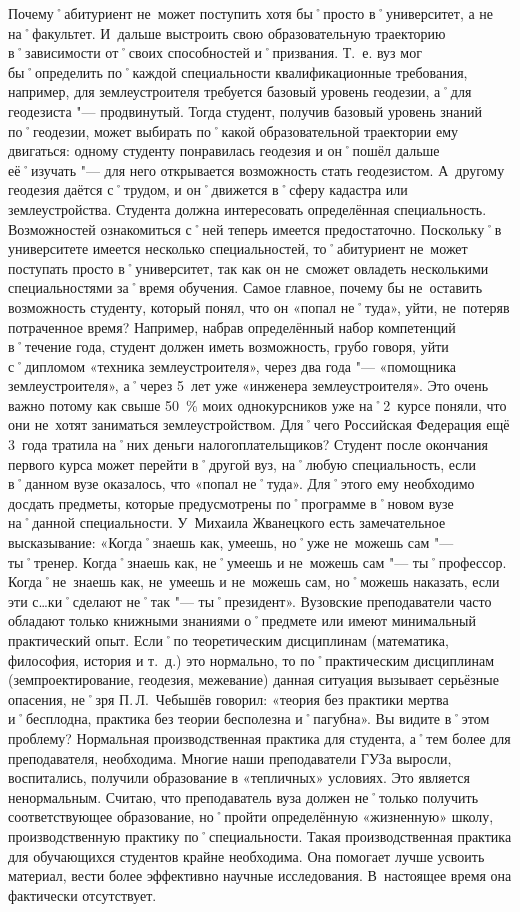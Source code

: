 \begin{drama}
	\maxspeaks Почему˚абитуриент не~может поступить хотя бы˚просто в˚университет, а не на˚факультет. И~дальше выстроить свою образовательную траекторию в˚зависимости от˚своих способностей и˚призвания. Т.~е. вуз мог бы˚определить по˚каждой специальности квалификационные требования, например, для землеустроителя требуется базовый уровень геодезии, а˚для геодезиста "--- продвинутый. Тогда студент, получив базовый уровень знаний по˚геодезии, может выбирать по˚какой образовательной траектории ему двигаться: одному студенту понравилась геодезия и он˚пошёл дальше её˚изучать "--- для него открывается возможность стать геодезистом. А~другому геодезия даётся с˚трудом, и он˚движется в˚сферу кадастра или землеустройства. 
	\michaelspeaks Студента должна интересовать определённая специальность. Возможностей ознакомиться с˚ней теперь имеется предостаточно. Поскольку˚в университете имеется несколько специальностей, то˚абитуриент не~может поступать просто в˚университет, так как он не~сможет овладеть несколькими специальностями за˚время обучения.
	\maxspeaks Самое главное, почему бы не~оставить возможность студенту, который понял, что он  «попал не˚туда», уйти, не~потеряв потраченное время? Например, набрав определённый набор компетенций в˚течение года, студент должен иметь возможность, грубо говоря, уйти с˚дипломом  «техника землеустроителя», через два года "---  «помощника землеустроителя», а˚через 5~лет уже  «инженера землеустроителя». Это очень важно потому как свыше 50~\% моих однокурсников уже на˚2~курсе поняли, что они не~хотят заниматься землеустройством. Для˚чего Российская Федерация ещё 3~года тратила на˚них деньги налогоплательщиков?
	\michaelspeaks Студент после окончания первого курса может перейти в˚другой вуз, на˚любую специальность, если в˚данном вузе оказалось, что «попал не˚туда». Для˚этого ему необходимо досдать предметы, которые предусмотрены по˚программе в˚новом вузе на˚данной специальности.
	\maxspeaks У~Михаила Жванецкого есть замечательное высказывание:  «Когда˚знаешь как, умеешь, но˚уже не~можешь сам "--- ты˚тренер. Когда˚знаешь как, не˚умеешь и не~можешь сам "--- ты˚профессор. Когда˚не~знаешь как, не~умеешь и не~можешь сам, но˚можешь наказать, если эти с…ки˚сделают не˚так "--- ты˚президент». Вузовские преподаватели часто обладают только книжными знаниями о˚предмете или имеют минимальный практический опыт. Если˚по теоретическим дисциплинам (математика, философия, история и т.~д.) это нормально, то по˚практическим дисциплинам (земпроектирование, геодезия, межевание) данная ситуация вызывает серьёзные опасения, не˚зря П.\,Л.~Чебышёв говорил:  «теория без практики мертва и˚бесплодна, практика без теории бесполезна и˚пагубна». Вы видите в˚этом проблему?
	\michaelspeaks Нормальная производственная практика для студента, а˚тем более для преподавателя, необходима. Многие наши преподаватели ГУЗа выросли, воспитались, получили образование в «тепличных» условиях. Это является ненормальным. Считаю, что преподаватель вуза должен не˚только получить соответствующее образование, но˚пройти определённую «жизненную» школу, производственную практику по˚специальности. Такая производственная практика для обучающихся студентов крайне необходима. Она помогает лучше усвоить материал, вести более эффективно научные исследования. В~настоящее время она фактически отсутствует.
	

\end{drama}
